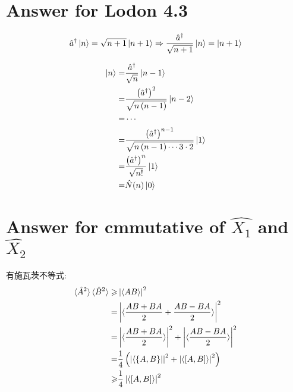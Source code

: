 \documentclass[twoside]{article}
\begin{document}
\section*{Answer for Lodon 4.3}

\begin{equation*}
    \hat{a}^\dagger \ket{n} = \sqrt{n+1}\ket{n+1} \Rightarrow \frac{\hat{a}^\dagger}{\sqrt{n+1}}\ket{n} = \ket{n+1}
\end{equation*}

\begin{equation*}
    \begin{split}
        \ket{n} = & \frac{\hat{a}^\dagger}{\sqrt{n}}\ket{n-1}                                                    \\
        =         & \frac{\left(\hat{a}^\dagger\right)^2}{\sqrt{n\left(n-1\right)}}\ket{n-2}                     \\
        =         & \cdots                                                                                       \\
        =         & \frac{\left(\hat{a}^\dagger\right)^{n-1}}{\sqrt{n\left(n-1\right) \cdots 3 \cdot  2}}\ket{1} \\
        =         & \frac{\left(\hat{a}^\dagger\right)^{n}}{\sqrt{n!}}\ket{1}                                    \\
        =         & \hat{N}(n) \ket{0}
    \end{split}
\end{equation*}


\section*{Answer for cmmutative of $\hat{X_1}$ and $\hat{X_2}$}




有施瓦茨不等式:
\begin{equation*}
    \begin{split}
        \braket{\hat{A}^2}\braket{\hat{B}^2} \geqslant & \left|\braket{AB}\right|^2                                                                                   \\
        =                                              & \left|\braket{\frac{AB + BA}{2} + \frac{AB - BA}{2}}\right|^2                                                \\
        =                                              & \left|\braket{\frac{AB + BA}{2}}\right|^2 + \left|\braket{\frac{AB - BA}{2}}\right|^2                        \\
        =                                              & \frac{1}{4}\left(\left|\bra{\left\{A, B\right\}}\right|^2 + \left|\braket{\left[A, B\right]}\right|^2\right) \\
        \geqslant                                      & \frac{1}{4} \left|\braket{\left[A, B\right]}\right|^2
    \end{split}
\end{equation*}
\end{document}
